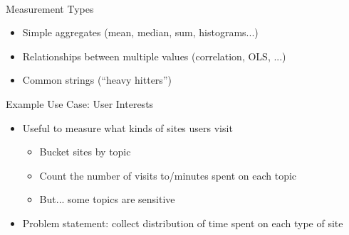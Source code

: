 \documentclass[helvetica]{beamer}
\begin{document}
\begin{frame}{Measurement Types}
  \begin{itemize}
  \item Simple aggregates (mean, median, sum, histograms...)
  \item Relationships between multiple values (correlation, OLS, ...)
  \item Common strings (``heavy hitters'')    
  \end{itemize}
\end{frame}

\begin{frame}{Example Use Case: User Interests}

  \begin{itemize}
  \item Useful to measure what kinds of sites users visit
    \begin{itemize}
    \item Bucket sites by topic
    \item Count the number of visits to/minutes spent on each topic
    \item But... some topics are sensitive
    \end{itemize}
    
  \item Problem statement: collect distribution of time spent on each type of site
  \end{itemize}
\end{frame}
\end{document}
